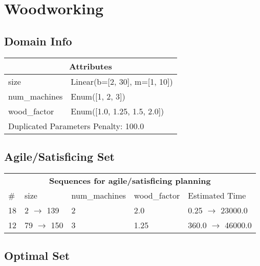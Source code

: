 \documentclass{article}
\begin{document}
                            \newpage \section{Woodworking}
                    \subsection*{Domain Info}

                    \begin{center}
                    \begin{tabular}{@{}p{}p{}@{}}
                    \multicolumn{2}{c}{\bf \large Attributes}\\\midrule
                    size & Linear(b=[2, 30], m=[1, 10])\\
num\_machines & Enum([1, 2, 3])\\
wood\_factor & Enum([1.0, 1.25, 1.5, 2.0])
                    
                     \\\midrule
                    \multicolumn{2}{l}{Duplicated Parameters Penalty: 100.0}
                    \end{tabular}
                    \end{center}
                
                         \subsection*{Agile/Satisficing Set}

                        \begin{center}
                        \begin{tabular}{@{}l|l|l|l|l@{}}
                        \multicolumn{5}{c}{\bf \large Sequences for agile/satisficing planning}\\
                        \# & size & num\_machines & wood\_factor & Estimated Time\\\midrule
                        18&2 $\rightarrow$ 139&2&2.0&0.25 $\rightarrow$ 23000.0\\
12&79 $\rightarrow$ 150&3&1.25&360.0 $\rightarrow$ 46000.0
                        \end{tabular}
                        \end{center}
                    
                            \subsection*{Optimal Set}
\end{document}
